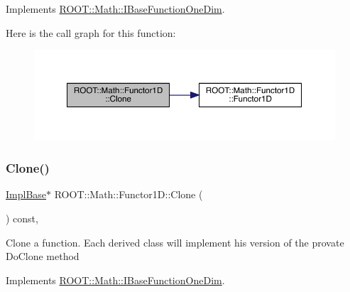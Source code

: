 Implements \mbox{\hyperlink{classROOT_1_1Math_1_1IBaseFunctionOneDim_a656dbb4dfc43e8d1566442bfb1a717fd}{R\+O\+O\+T\+::\+Math\+::\+I\+Base\+Function\+One\+Dim}}.

Here is the call graph for this function\+:
\nopagebreak
\begin{figure}[H]
\begin{center}
\leavevmode
\includegraphics[width=350pt]{dc/d6d/classROOT_1_1Math_1_1Functor1D_af77ece084fc56e41c06e32e0f78a88a9_cgraph}
\end{center}
\end{figure}
\mbox{\label{classROOT_1_1Math_1_1Functor1D_af77ece084fc56e41c06e32e0f78a88a9}} 
\subsubsection{\texorpdfstring{Clone()}{Clone()}\hspace{0.1cm}{\footnotesize\ttfamily [2/3]}}
{\footnotesize\ttfamily \mbox{\hyperlink{classROOT_1_1Math_1_1Functor1D_a1ade2017edb7db0cbaf9a27a864f4dd3}{Impl\+Base}}$\ast$ R\+O\+O\+T\+::\+Math\+::\+Functor1\+D\+::\+Clone (\begin{DoxyParamCaption}{ }\end{DoxyParamCaption}) const\hspace{0.3cm}{\ttfamily [inline]}, {\ttfamily [virtual]}}

Clone a function. Each derived class will implement his version of the provate Do\+Clone method 

Implements \mbox{\hyperlink{classROOT_1_1Math_1_1IBaseFunctionOneDim_a656dbb4dfc43e8d1566442bfb1a717fd}{R\+O\+O\+T\+::\+Math\+::\+I\+Base\+Function\+One\+Dim}}.

